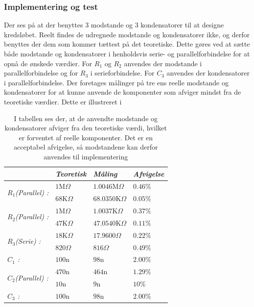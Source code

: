 \subsubsection{Implementering og test} 
Der ses på  at der benyttes 3 modstande og 3 kondensatorer til at designe kredsløbet. Reelt findes de udregnede modstande og kondensatorer ikke, og derfor benyttes der dem som kommer tættest på det teoretiske. Dette gøres ved at sætte både modstande og kondensatorer i henholdsvis serie- og parallelforbindelse for at opnå de ønskede værdier. For $R_{1}$ og $R_{2}$ anvendes der modstande i parallelforbindelse og for $R_{3}$ i serieforbindelse. For $C_3$ anvendes der kondensatorer i parallelforbindelse. Der foretages målinger på tre ens reelle modstande og kondensatorer for at kunne anvende de komponenter som afviger mindst fra de teoretiske værdier. Dette er illustreret i 
\begin{table}[H]
	\centering
	\begin{tabular}{|l|l|l|l|}
		\hline
		\textit{}                                     & \textit{Teoretisk} & \textit{Måling}    & \textit{Afvigelse} \\ \hline
		\multirow{2}{*}{\textit{$R_{1}$(Parallel) :}} & $1$M$\Omega$       & $1.0046$M$\Omega$  & $0.46\%$           \\ \cline{2-4} 
		& $68$K$\Omega$      & $68.0350$K$\Omega$ & $0.05\%$           \\ \hline
		\multirow{2}{*}{\textit{$R_{2}$(Parallel) :}} & $1$M$\Omega$       & $1.0037$K$\Omega$  & $0.37\%$           \\ \cline{2-4} 
		& $47$K$\Omega$      & $47.0540$K$\Omega$ & $0.11\%$           \\ \hline
		\multirow{2}{*}{\textit{$R_{3}$(Serie) :}}    & $18$K$\Omega$      & $17.9600\Omega$    & $0.22\%$           \\ \cline{2-4} 
		& $820\Omega$        & $816\Omega$        & $0.49\%$           \\ \hline
		\textit{$C_{1}$ :}                            & $100$n             & $98$n              & $2.00\%$           \\ \hline
		\multirow{2}{*}{\textit{$C_{2}$(Parallel) :}} & $470$n             & $464$n             & $1.29\%$           \\ \cline{2-4} 
		& $10$n              & $9$n               & $10\%$             \\ \hline
		\textit{$C_{3}$ :}                            & $100$n             & $98$n              & $2.00\%$           \\ \hline
	\end{tabular}
	\caption{I tabellen ses der, at de anvendte modstande og kondensatorer afviger fra den teoretiske værdi, hvilket er forventet af reelle komponenter. Det er en acceptabel afvigelse, så modstandene kan derfor anvendes til implementering}
	\label{Tab:Maalingfilter}
\end{table}
